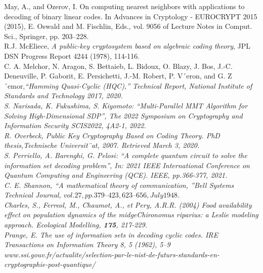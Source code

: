 \documentclass[12pt,openany]{report}
\begin{document}
\begin{thebibliography}{1}
 May, A., and Ozerov, I. On computing nearest neighbors with applications to decoding of binary
linear codes. In Advances in Cryptology - EUROCRYPT 2015 (2015), E. Oswald and M. Fischlin,
Eds., vol. 9056 of Lecture Notes in Comput. Sci., Springer, pp. 203–228.\\

 R.J. McEliece, {\em A public-key cryptosystem based on algebraic coding theory}, JPL DSN Progress Report 4244 (1978), 114-116. \\


 C. A. Melchor, N. Aragon, S. Bettaieb, L. Bidoux, O. Blazy, J. Bos, J.-C.
Deneuville, P. Gaborit, E. Persichetti, J.-M. Robert, P. V´eron, and G. Z´emor,\it{“Hamming Quasi-Cyclic (HQC),” Technical Report, National Institute of Standards and Technology 2017, 2020}.\\





 S. Narisada, K. Fukushima, S. Kiyomoto: “Multi-Parallel MMT Algorithm for Solving High-Dimensional SDP”, The 2022 Symposium on Cryptography and Information Security SCIS2022, 4A2-1, 2022.\\




 R. Overbeck, Public Key Cryptography Based on Coding Theory. PhD thesis,\it{Technische Universit¨at, 2007. Retrieved March 3, 2020}.\\


 S. Perriello, A. Barenghi, G. Pelosi: “A complete quantum circuit to solve the information set decoding problem”, In: 2021 IEEE International Conference on Quantum Computing and Engineering (QCE). IEEE, pp.366-377, 2021.\\

  C. E. Shannon, “A mathematical theory of communication, ”Bell Systems Technical Journal, $vol. 27, pp. 379–423,623–656, July 1948.$ \\


 Charles, S., Ferreol, M., Chaumot, A., et Pery, A.R.R.
(2004) Food availability effect on population dynamics of the midge{\it Chironomus riparius}: a Leslie modeling approach. {\it Ecological Modelling}, {\bf 175}, 217-229.\\









 Prange, E. The use of information sets in decoding cyclic codes. IRE Transactions on Information
Theory 8, 5 (1962), 5–9\\


  www.ssi.gouv.fr/actualite/selection-par-le-nist-de-futurs-standards-en-cryptographie-post-quantique/ \\


\end{thebibliography}
\end{document}
